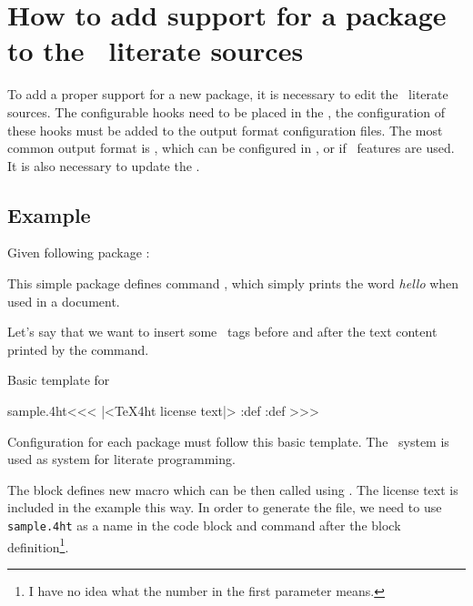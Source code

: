 \documentclass{book}
\begin{document}
\section{How to add support for a package to the \texfourht\ literate sources}

To add a proper support for a new package, it is necessary to edit the 
\texfourht\ literate sources. The configurable hooks need to be placed in the ,
the configuration of these hooks must be added to the output format configuration files.
The most common output format is \HTML, which can be configured in , or 
 if \HTMLV\ features are used. It is also necessary to update the
.

\subsection{Example}

Given following package :


This simple package defines command \texcommand{\hello}, which simply prints the word \textit{hello} when used in a document.

Let's say that we want to insert some \HTML\ tags before and after the text content printed by the command.

Basic template for 

\begin{texsource}
\<sample.4ht\><<<
|<TeX4ht license text|>
\pend:def
\append:def
>>> 
\end{texsource}

Configuration for each package must follow this basic template. The \ProTeX\ system is used as system for literate programming.

The  block defines new macro which can be then called using . The license text
is included in the example this way. In order to generate the  file, we need to use \texttt{sample.4ht} as a name
in the code block and command  after the block definition\footnote{I have no idea what the number
in the first parameter means.}.
\end{document}

